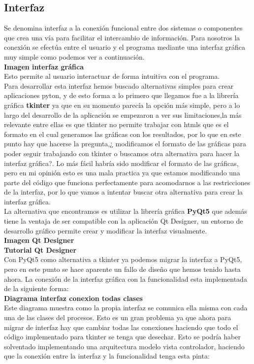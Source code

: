 \documentclass[12pt,a4paper]{article}
\begin{document}
	\subsection{Interfaz}
	Se denomina interfaz a la conexión funcional entre dos sistemas o componentes que crea una vía para facilitar el intercambio de información. Para nosotros la conexión se efectúa entre el usuario y el programa mediante una interfaz gráfica muy simple como podemos ver a continuación.\\
	 \textbf{Imagen interfaz gráfica}\\
	 Esto permite al usuario interactuar de forma intuitiva con el programa.\\
	 Para desarrollar esta interfaz hemos buscado alternativas simples para crear aplicaciones pyton, y de esto forma a lo primero que llegamos fue a la librería gráfica \textbf{tkinter} ya que en su momento parecía la opción más simple, pero a lo largo del desarrollo de la aplicación se empezaron a ver sus limitaciones,la más relevante entre ellas es que tkinter no permite trabajar con htmls que es el formato en el cual generamos las gráficas con los resultados, por lo que en este punto hay que hacerse la pregunta,¿ modificamos el formato de las gráficas para poder seguir trabajando con tkinter o buscamos otra alternativa para hacer la interfaz gráfica?. Lo más fácil habría sido modificar el formato de las gráficas, pero en mi opinión esto es una mala practica ya que estamos modificando una parte del código que funciona perfectamente para acomodarnos a las restricciones de la interfaz, por lo que vamos a intentar buscar otra alternativa para crear la interfaz gráfica.\\
	 La alternativa que encontramos es utilizar la librería gráfica  \textbf{PyQt5} que además tiene la ventaja de ser compatible con la aplicación Qt Designer, un entorno de desarrollo gráfico permite crear y modificar la interfaz visualmente.\\
	 \textbf{Imagen Qt Designer}\\
	 \textbf{Tutorial Qt Designer}\\
	 Con PyQt5 como alternativa a tkinter ya podemos migrar la interfaz a PyQt5, pero en este punto se hace aparente un fallo de diseño que hemos tenido hasta ahora. La conexión de la interfaz gráfica con la funcionalidad esta implementada de la siguiente forma:\\
	 \textbf{Diagrama interfaz conexion todas clases}\\
	 Este diagrama muestra como la propia interfaz se comunica ella misma con cada una de las clases del procesos. Esto es un gran problema ya que ahora para migrar de interfaz hay que cambiar todas las conexiones haciendo que todo el código implementado para tkinter se tenga que desechar. Esto se podría haber solventado implementando una arquitectura modelo vista controlador, haciendo que la conexión entre la interfaz y la funcionalidad tenga esta pinta:\\
\end{document}
